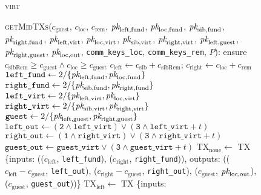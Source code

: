 \begin{figure}[H]
  \begin{processbox}{\textsc{virt}}
    \begin{algorithmic}[1]
      \State \textsc{getMidTXs}($c_{\mathrm{guest}}$, $c_{\mathrm{loc}}$,
      $c_{\mathrm{rem}}$, $\textit{pk}_{\mathrm{left}, \mathrm{fund}}$,
      $\textit{pk}_{\mathrm{loc}, \mathrm{fund}}$, $\textit{pk}_{\mathrm{sib}, \mathrm{fund}}$,
      $\textit{pk}_{\mathrm{right}, \mathrm{fund}}$, $\textit{pk}_{\mathrm{left}, \mathrm{virt}}$,
      $\textit{pk}_{\mathrm{loc}, \mathrm{virt}}$, $\textit{pk}_{\mathrm{sib}, \mathrm{virt}}$,
      $\textit{pk}_{\mathrm{right}, \mathrm{virt}}$, $\textit{pk}_{\mathrm{left},
      \mathrm{guest}}$, $\textit{pk}_{\mathrm{right}, \mathrm{guest}}$,
      $\textit{pk}_{\mathrm{loc}, \mathrm{out}}$, \texttt{comm\_keys\_loc},
      \texttt{comm\_keys\_rem}, $P$):
      \Indent
        \State ensure $c_{\mathrm{sibRem}} \geq c_{\mathrm{guest}} \wedge
        c_{\mathrm{loc}} \geq c_{\mathrm{guest}}$
        \State $c_{\mathrm{left}} \gets c_{\mathrm{sib}} + c_{\mathrm{sibRem}}$;
        $c_{\mathrm{right}} \gets c_{\mathrm{loc}} + c_{\mathrm{rem}}$
        \State $\texttt{left\_fund} \gets 2/\{\textit{pk}_{\mathrm{left}, \mathrm{fund}},
        \textit{pk}_{\mathrm{loc}, \mathrm{fund}}\}$
        \State $\texttt{right\_fund} \gets 2/\{\textit{pk}_{\mathrm{sib}, \mathrm{fund}},
        \textit{pk}_{\mathrm{right}, \mathrm{fund}}\}$
        \State $\texttt{left\_virt} \gets 2/\{\textit{pk}_{\mathrm{left}, \mathrm{virt}},
        \textit{pk}_{\mathrm{loc}, \mathrm{virt}}\}$
        \State $\texttt{right\_virt} \gets 2/\{\textit{pk}_{\mathrm{sib}, \mathrm{virt}},
        \textit{pk}_{\mathrm{right}, \mathrm{virt}}\}$
        \State $\texttt{guest} \gets 2/\{\textit{pk}_{\mathrm{left}, \mathrm{guest}},
        \textit{pk}_{\mathrm{right}, \mathrm{guest}}\}$
        \State $\texttt{left\_out} \gets (\texttt{2} \wedge \texttt{left\_virt})
        \vee (\texttt{3} \wedge \texttt{left\_virt} + t)$
        \State $\texttt{right\_out} \gets (\texttt{1} \wedge
        \texttt{right\_virt}) \vee (\texttt{3} \wedge \texttt{right\_virt} + t)$
        \State $\texttt{guest\_out} \gets \texttt{guest\_virt} \vee (\texttt{3}
        \wedge \texttt{guest\_virt} + t)$
        \State $\mathrm{TX}_{\mathrm{none}} \gets$ TX \{inputs:
        (($c_{\mathrm{left}}$, \texttt{left\_fund}), ($c_{\mathrm{right}}$,
        \texttt{right\_fund})), outputs: (($c_{\mathrm{left}} -
        c_{\mathrm{guest}}$, \texttt{left\_out}), ($c_{\mathrm{right}} -
        c_{\mathrm{guest}}$, \texttt{right\_out}), ($c_{\mathrm{guest}}$,
        $\textit{pk}_{\mathrm{loc}, \mathrm{out}}$), ($c_{\mathrm{guest}}$,
        \texttt{guest\_out}))\}
        \State $\mathrm{TX}_{\mathrm{left}} \gets$ TX \{inputs:

\end{algorithmic}
\end{processbox}
\end{figure}
